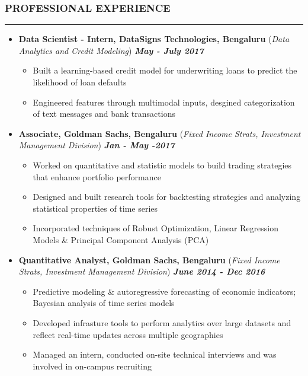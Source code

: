 \documentclass[10pt,a4paper,English]{article}
\newcommand\roottitle[1]{\vspace{-4mm}\subsubsection*{\uppercase{#1}}\vspace{-0.3em}\nopagebreak[4]\hrule\vspace{4mm}}
\newcommand\itemyear[1]{\hfill \textbf{\emph{\color{itemyear} #1}}}
\newcommand\itemenv{\setlength\itemsep{0.5pt} \addtolength{\itemindent}{-5mm}\vspace{-1.5mm}}
\begin{document}
\vspace{1.5mm}

\roottitle{Professional Experience}
\begin{itemize} \itemenv

    \item \textbf{Data Scientist - Intern, DataSigns Technologies, Bengaluru } \hfill({\emph{Data Analytics and Credit Modeling}}) \itemyear{May - July 2017}
        \begin{itemize} \itemenv
            \item Built a learning-based credit model for underwriting loans to predict the likelihood of loan defaults
            \item Engineered features through multimodal inputs,\; desgined categorization of text messages and bank transactions
        \end{itemize}

    \item \textbf{Associate, Goldman Sachs, Bengaluru} \hfill (\emph{Fixed Income Strats, Investment Management Division}) \itemyear{Jan - May -2017}
        \begin{itemize} \itemenv
            \item Worked on quantitative and statistic models to build trading strategies that enhance portfolio performance
            \item Designed and built research tools for backtesting strategies and analyzing statistical properties of time series
            \item Incorporated techniques of Robust Optimization, Linear Regression Models \& Principal Component Analysis (PCA)
        \end{itemize}

    \item \textbf{Quantitative Analyst, Goldman Sachs, Bengaluru} \hfill (\emph{Fixed Income Strats, Investment Management Division}) \itemyear{June 2014 - Dec 2016}
        \begin{itemize} \itemenv 
            \item Predictive modeling \& autoregressive forecasting of economic indicators; Bayesian analysis of time series models
            \item Developed infrasture tools to perform analytics over large datasets and reflect real-time updates across multiple geographies
            \item Managed an intern, conducted on-site technical interviews and was involved in on-campus recruiting
        \end{itemize}


\end{itemize}
\end{document}
